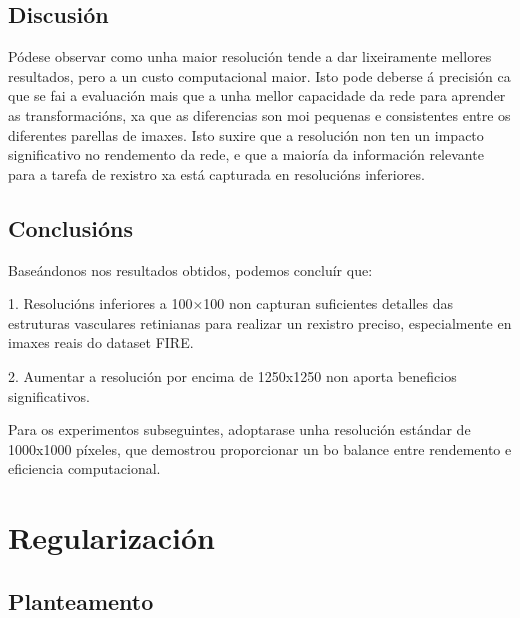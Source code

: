 
\subsection{Discusión}
\label{subsec:Discusion-resolution}

Pódese observar como unha maior resolución tende a dar lixeiramente mellores resultados, pero a un custo computacional maior.
Isto pode deberse á precisión ca que se fai a evaluación mais que a unha mellor capacidade da rede para aprender as transformacións, xa que as diferencias son moi pequenas e consistentes entre os diferentes parellas de imaxes.
Isto suxire que a resolución non ten un impacto significativo no rendemento da rede, e que a maioría da información relevante para a tarefa de rexistro xa está capturada en resolucións inferiores.


\subsection{Conclusións}
\label{subsec:Conclusions-resolution}

Baseándonos nos resultados obtidos, podemos concluír que:

1. Resolucións inferiores a 100×100 non capturan suficientes detalles das estruturas vasculares retinianas para realizar un rexistro preciso, especialmente en imaxes reais do dataset FIRE.

2. Aumentar a resolución por encima de 1250x1250 non aporta beneficios significativos.


Para os experimentos subseguintes, adoptarase unha resolución estándar de 1000x1000 píxeles, que demostrou proporcionar un bo balance entre rendemento e eficiencia computacional.

\section{Regularización}
\label{sec:Regularización}

\subsection{Planteamento}
\label{subsec:Planteamento-regularization}

